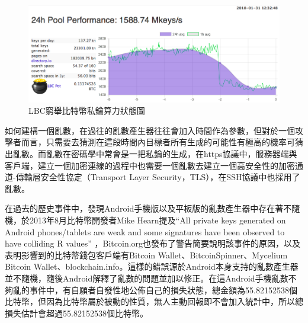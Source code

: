 			\begin{figure}[htbp]
				\centering
				\includegraphics[width = .9\textwidth]{LBC.png}
				\caption{LBC窮舉比特幣私鑰算力狀態圖\supercite{TheLargeBitcoinCollider}}\label{LBC}
			\end{figure}

			如何建構一個亂數，在過往的亂數產生器往往會加入時間作為參數，但對於一個攻擊者而言，只需要去猜測在這段時間內目標者所有生成的可能性有極高的機率可猜出亂數。而亂數在密碼學中常會是一把私鑰的生成，在https協議中，服務器端與客戶端，建立一個加密連線的過程中也需要一個亂數去建立一個高安全性的加密通道-傳輸層安全性協定（Transport Layer Security，TLS）\supercite{dierks2008transport}，在SSH協議中也採用了亂數。
	
			在過去的歷史事件中，發現Android手機版以及平板版的亂數產生器中存在著不隨機，於2013年8月比特幣開發者Mike Hearn提及“All private keys generated on Android phones/tablets are weak and some signatures have been observed to have colliding R values” \supercite{SomeSecureRandomThoughts}，Bitcoin.org也發布了警告\supercite{AndroidSecurityVulnerability}簡要說明該事件的原因，以及表明影響到的比特幣錢包客戶端有Bitcoin Wallet、BitcoinSpinner、Mycelium Bitcoin Wallet、blockchain.info。這樣的錯誤源於Android本身支持的亂數產生器並不隨機，隨後Android解釋了亂數的問題並加以修正。在這Android手機亂數不夠亂的事件中，有自願者自發性地公佈自己的損失狀態，總金額為55.82152538個比特幣\supercite{Badsignaturesleading}，但因為比特幣屬於被動的性質，無人主動回報即不會加入統計中，所以總損失估計會超過55.82152538個比特幣。

